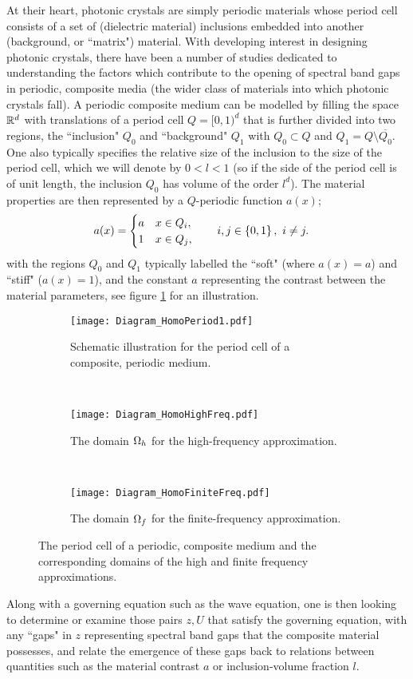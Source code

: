 At their heart, photonic crystals are simply periodic materials whose period cell consists of a set of (dielectric material) inclusions embedded into another (background, or ``matrix") material.
With developing interest in designing photonic crystals, there have been a number of studies dedicated to understanding the factors which contribute to the opening of spectral band gaps in periodic, composite media (the wider class of materials into which photonic crystals fall).
A periodic composite medium can be modelled by filling the space $\mathbb{R}^d$ with translations of a period cell $Q=[0,1)^d$ that is further divided into two regions, the ``inclusion" $Q_0$ and ``background" $Q_1$ with $Q_0\subset Q$ and $Q_1=Q\setminus\overline{Q_0}$.
One also typically specifies the relative size of the inclusion to the size of the period cell, which we will denote by $0<l<1$ (so if the side of the period cell is of unit length, the inclusion $Q_0$ has volume of the order $l^d$).
The material properties are then represented by a $Q$-periodic function $a(x)$;
\begin{align*}
	a(x) &= \begin{cases} a & x\in Q_i, \\ 1 & x\in Q_j, \end{cases}
	\qquad i,j\in\left\{ 0,1 \right\}, \ i\neq j.
\end{align*}
with the regions $Q_0$ and $Q_1$ typically labelled the ``soft" (where $a(x)=a$) and ``stiff" ($a(x)=1$), and the constant $a$ representing the contrast between the material parameters, see figure \ref{fig:Diagram_HomoPeriod1} for an illustration.
\begin{figure}[b]
	\centering
	\begin{subfigure}[t]{0.3\textwidth}
		\centering
		\texttt{[image: Diagram\_HomoPeriod1.pdf]}
		\caption{\label{fig:Diagram_HomoPeriod1} Schematic illustration for the period cell of a composite, periodic medium.}
	\end{subfigure}
	~
	\begin{subfigure}[t]{0.3\textwidth}
		\centering
		\texttt{[image: Diagram\_HomoHighFreq.pdf]}
		\caption{\label{fig:Diagram_HomoHighFreq} The domain $\Omega_h$ for the high-frequency approximation.}
	\end{subfigure}
	~
	\begin{subfigure}[t]{0.3\textwidth}
		\centering
		\texttt{[image: Diagram\_HomoFiniteFreq.pdf]}
		\caption{\label{fig:Diagram_HomoFiniteFreq} The domain $\Omega_f$ for the finite-frequency approximation.}
	\end{subfigure}
	\caption{\label{fig:Diagram_HomoFreqRanges} The period cell of a periodic, composite medium and the corresponding domains of the high and finite frequency approximations.}	
\end{figure}
Along with a governing equation such as the wave equation, one is then looking to determine or examine those pairs $z, U$ that satisfy the governing equation, with any ``gaps" in $z$ representing spectral band gaps that the composite material possesses, and relate the emergence of these gaps back to relations between quantities such as the material contrast $a$ or inclusion-volume fraction $l$.

